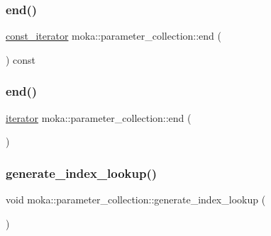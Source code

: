 \mbox{\label{classmoka_1_1parameter__collection_a8fb5d245c9f90146b866ed0128eb693b}} 
\subsubsection{\texorpdfstring{end()}{end()}\hspace{0.1cm}{\footnotesize\ttfamily [1/2]}}
{\footnotesize\ttfamily \mbox{\hyperlink{classmoka_1_1parameter__collection_a6d2ad87d4e43742300cb9ded3beee731}{const\+\_\+iterator}} moka\+::parameter\+\_\+collection\+::end (\begin{DoxyParamCaption}{ }\end{DoxyParamCaption}) const}

\mbox{\label{classmoka_1_1parameter__collection_a3f4a4ceed264f9fcb280be268f471323}} 
\subsubsection{\texorpdfstring{end()}{end()}\hspace{0.1cm}{\footnotesize\ttfamily [2/2]}}
{\footnotesize\ttfamily \mbox{\hyperlink{classmoka_1_1parameter__collection_a2ec8bed3c1d7de9e5c2199ede27aa919}{iterator}} moka\+::parameter\+\_\+collection\+::end (\begin{DoxyParamCaption}{ }\end{DoxyParamCaption})}

\mbox{\label{classmoka_1_1parameter__collection_ae8bf8ef669a0542baae8693c2daebe2f}} 
\subsubsection{\texorpdfstring{generate\_index\_lookup()}{generate\_index\_lookup()}}
{\footnotesize\ttfamily void moka\+::parameter\+\_\+collection\+::generate\+\_\+index\+\_\+lookup (\begin{DoxyParamCaption}{ }\end{DoxyParamCaption})}

